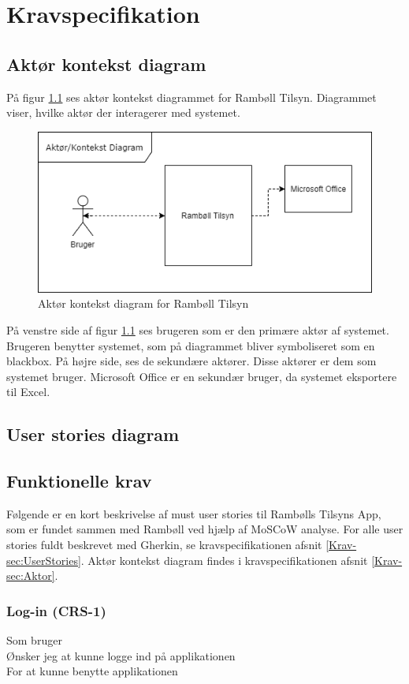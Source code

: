 	\chapter{Kravspecifikation}
	
	\section{Aktør kontekst diagram}
		På figur \ref{fig:AktorKontekst} ses aktør kontekst diagrammet for Rambøll Tilsyn. Diagrammet viser, hvilke aktør der interagerer med systemet.
	\begin{figure}[H]
		\centering
		\includegraphics[width=0.6\linewidth]{Kravspecifikation/AktorDiagram}
		\caption{Aktør kontekst diagram for Rambøll Tilsyn}
		\label{fig:AktorKontekst}
	\end{figure}

		På venstre side af figur \ref{fig:AktorKontekst} ses brugeren som er den primære aktør af systemet. Brugeren benytter systemet, som på diagrammet bliver symboliseret som en blackbox. På højre side, ses de sekundære aktører. Disse aktører er dem som systemet bruger. Microsoft Office er en sekundær bruger, da systemet eksportere til Excel.
	
	\section{User stories diagram}

	\section{Funktionelle krav} 
	Følgende er en kort beskrivelse af must user stories til Rambølls Tilsyns App, som er fundet sammen med Rambøll ved hjælp af MoSCoW analyse. \cite{MoSCoW} For alle user stories fuldt beskrevet med Gherkin, se kravspecifikationen afsnit \ref{Krav-sec:UserStories}.
	Aktør kontekst diagram findes i kravspecifikationen afsnit \ref{Krav-sec:Aktor}.

	\subsection*{Log-in (CRS-1)}
	Som bruger\\
	Ønsker jeg at kunne logge ind på applikationen\\
	For at kunne benytte applikationen
	
